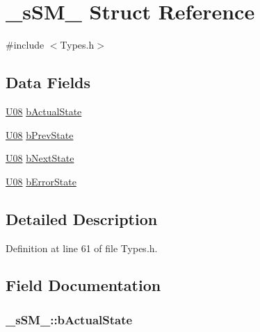 \hypertarget{struct__s_s_m__}{}\section{\+\_\+s\+S\+M\+\_\+ Struct Reference}
\label{struct__s_s_m__}


{\ttfamily \#include $<$Types.\+h$>$}

\subsection*{Data Fields}
\begin{DoxyCompactItemize}
\item 
\hyperlink{_types_8h_a3fd534ebc238a0e487b81bda78811de6}{U08} \hyperlink{struct__s_s_m___adcfe948e752dbfc52d3a810792f4ca77}{b\+Actual\+State}
\item 
\hyperlink{_types_8h_a3fd534ebc238a0e487b81bda78811de6}{U08} \hyperlink{struct__s_s_m___ac16c54360c2557d7b811fa9d9789ae37}{b\+Prev\+State}
\item 
\hyperlink{_types_8h_a3fd534ebc238a0e487b81bda78811de6}{U08} \hyperlink{struct__s_s_m___acac983c7a642ce525beef00a38c2bb01}{b\+Next\+State}
\item 
\hyperlink{_types_8h_a3fd534ebc238a0e487b81bda78811de6}{U08} \hyperlink{struct__s_s_m___ae352c7c0e16b2aa7927f3de235c5551a}{b\+Error\+State}
\end{DoxyCompactItemize}


\subsection{Detailed Description}


Definition at line 61 of file Types.\+h.



\subsection{Field Documentation}
\subsubsection[{\texorpdfstring{b\+Actual\+State}{bActualState}}]{ \+\_\+s\+S\+M\+\_\+\+::b\+Actual\+State}\hypertarget{struct__s_s_m___adcfe948e752dbfc52d3a810792f4ca77}{}\label{struct__s_s_m___adcfe948e752dbfc52d3a810792f4ca77}


